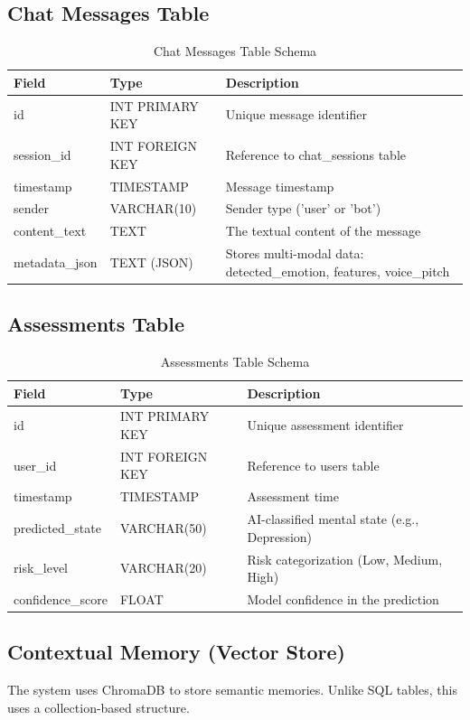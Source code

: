 \documentclass[11pt]{report}
\begin{document}
\subsection{Chat Messages Table}
\begin{table}[H]
\centering
\caption{Chat Messages Table Schema}
\label{tab:messages_table}
\begin{tabular}{|p{3cm}|p{3cm}|p{9cm}|}
\hline
Field & Type & Description \\ \hline
id & INT PRIMARY KEY & Unique message identifier \\ 
session\_id & INT FOREIGN KEY & Reference to chat\_sessions table \\ 
timestamp & TIMESTAMP & Message timestamp \\ 
sender & VARCHAR(10) & Sender type ('user' or 'bot') \\ 
content\_text & TEXT & The textual content of the message \\ 
metadata\_json & TEXT (JSON) & Stores multi-modal data: detected\_emotion, features, voice\_pitch \\ 
\hline
\end{tabular}
\end{table}

\subsection{Assessments Table}
\begin{table}[H]
\centering
\caption{Assessments Table Schema}
\label{tab:assessments_table}
\begin{tabular}{|p{3cm}|p{3cm}|p{9cm}|}
\hline
Field & Type & Description \\ \hline
id & INT PRIMARY KEY & Unique assessment identifier \\ 
user\_id & INT FOREIGN KEY & Reference to users table \\ 
timestamp & TIMESTAMP & Assessment time \\ 
predicted\_state & VARCHAR(50) & AI-classified mental state (e.g., Depression) \\ 
risk\_level & VARCHAR(20) & Risk categorization (Low, Medium, High) \\ 
confidence\_score & FLOAT & Model confidence in the prediction \\ 
\hline
\end{tabular}
\end{table}

\subsection{Contextual Memory (Vector Store)}
The system uses ChromaDB to store semantic memories. Unlike SQL tables, this uses a collection-based structure.
\end{document}
